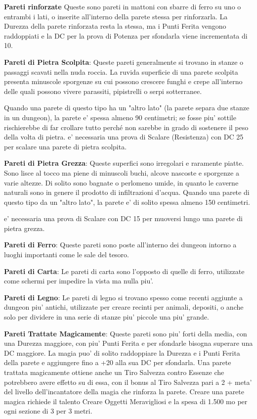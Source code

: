 \documentclass[a4paper,11pt,twoside,openany]{book}
\begin{document}
{\textbf{Pareti rinforzate} Queste sono pareti in mattoni con sbarre di ferro su uno o entrambi i lati, o inserite all’interno della parete stessa per rinforzarla. La Durezza della parete rinforzata resta la stessa, ma i Punti Ferita vengono raddoppiati e la DC per la prova di Potenza per sfondarla viene incrementata di 10.

\textbf{Pareti di Pietra Scolpita}: Queste pareti generalmente si trovano in stanze o passaggi scavati nella nuda roccia. La ruvida superficie di una parete scolpita presenta minuscole sporgenze su cui possono crescere funghi e crepe all'interno delle quali possono vivere parassiti, pipistrelli o serpi sotterranee. 

Quando una parete di questo tipo ha un "altro lato" (la parete separa due stanze in un dungeon), la parete e' spessa almeno 90 centimetri; se fosse piu' sottile rischierebbe di far crollare tutto perché non sarebbe in grado di sostenere il peso della volta di pietra. e' necessaria una prova di Scalare (Resistenza) con DC 25 per scalare una parete di pietra scolpita.

\textbf{Pareti di Pietra Grezza}: Queste superfici sono irregolari e raramente piatte. Sono lisce al tocco ma piene di minuscoli buchi, alcove nascoste e sporgenze a varie altezze. Di solito sono bagnate o perlomeno umide, in quanto le caverne naturali sono in genere il prodotto di infiltrazioni d'acqua. Quando una parete di questo tipo da un "altro lato", la parete e' di solito spessa almeno 150 centimetri.

e' necessaria una prova di Scalare con DC 15 per muoversi lungo una parete di pietra grezza.

\textbf{Pareti di Ferro}: Queste pareti sono poste all'interno dei dungeon intorno a luoghi importanti come le sale del tesoro.

\textbf{Pareti di Carta}: Le pareti di carta sono l'opposto di quelle di ferro, utilizzate come schermi per impedire la vista ma nulla piu'.

\textbf{Pareti di Legno}: Le pareti di legno si trovano spesso come recenti aggiunte a dungeon piu' antichi, utilizzate per creare recinti per animali, depositi, o anche solo per dividere in una serie di stanze piu' piccole una piu' grande.

\textbf{Pareti Trattate Magicamente}: Queste pareti sono piu' forti della media, con una Durezza maggiore, con piu' Punti Ferita e per sfondarle bisogna superare una DC maggiore. La magia puo' di solito raddoppiare la Durezza e i Punti Ferita della parete e aggiungere fino a +20 alla sua DC per sfondarla. Una parete trattata magicamente ottiene anche un Tiro Salvezza contro Essenze che potrebbero avere effetto su di essa, con il bonus al Tiro Salvezza pari a 2 + meta' del livello dell'incantatore della magia che rinforza la parete. Creare una parete magica richiede il talento Creare Oggetti Meravigliosi e la spesa di 1.500 mo per ogni sezione di 3 per 3 metri.

}
\end{document}
